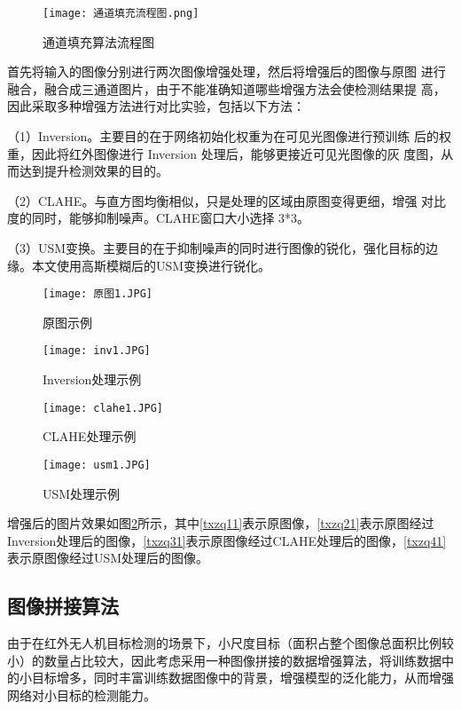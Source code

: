 \begin{figure}[h]
  \centering
  \texttt{[image: 通道填充流程图.png]}
  \caption{通道填充算法流程图}
  \label{tdtc}
\end{figure}

首先将输入的图像分别进行两次图像增强处理，然后将增强后的图像与原图
进行融合，融合成三通道图片，由于不能准确知道哪些增强方法会使检测结果提
高，因此采取多种增强方法进行对比实验，包括以下方法：

（1）Inversion。主要目的在于网络初始化权重为在可见光图像进行预训练
后的权重，因此将红外图像进行 Inversion 处理后，能够更接近可见光图像的灰
度图，从而达到提升检测效果的目的。

（2）CLAHE。与直方图均衡相似，只是处理的区域由原图变得更细，增强
对比度的同时，能够抑制噪声。CLAHE窗口大小选择 3*3。

（3）USM变换。主要目的在于抑制噪声的同时进行图像的锐化，强化目标的边缘。本文使用高斯模糊后的USM变换进行锐化。

\begin{figure}[htbp]
	\centering
	\begin{minipage}{0.49\linewidth}
		\centering
		\texttt{[image: 原图1.JPG]}
		\caption{原图示例}
		\label{txzq11}%
	\end{minipage}
	\begin{minipage}{0.49\linewidth}
		\centering
		\texttt{[image: inv1.JPG]}
		\caption{Inversion处理示例}
		\label{txzq21}%
	\end{minipage}
	
	\begin{minipage}{0.49\linewidth}
		\centering
		\texttt{[image: clahe1.JPG]}
		\caption{CLAHE处理示例}
		\label{txzq31}%
	\end{minipage}
	\begin{minipage}{0.49\linewidth}
		\centering
		\texttt{[image: usm1.JPG]}
		\caption{USM处理示例}
		\label{txzq41}%
	\end{minipage}
  \label{txzq}
\end{figure}

增强后的图片效果如图\ref{txzq}所示，其中\ref{txzq11}表示原图像，\ref{txzq21}表示原图经过Inversion处理后的图像，\ref{txzq31}表示原图像经过CLAHE处理后的图像，\ref{txzq41}表示原图像经过USM处理后的图像。

\subsection{图像拼接算法}
由于在红外无人机目标检测的场景下，小尺度目标（面积占整个图像总面积比例较小）的数量占比较大，因此考虑采用一种图像拼接的数据增强算法，将训练数据中的小目标增多，同时丰富训练数据图像中的背景，增强模型的泛化能力，从而增强网络对小目标的检测能力。

